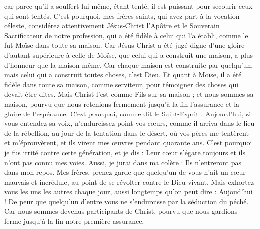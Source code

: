 \begin{multicols}{2}
car parce qu'il a souffert lui-même, étant tenté, il est puissant pour secourir ceux qui sont tentés.
\VerseOne{}C'est pourquoi, mes frères saints, qui avez part à la vocation céleste, considérez attentivement Jésus-Christ l'Apôtre et le Souverain Sacrificateur de notre profession,
qui a été fidèle à celui qui l'a établi, comme le fut Moïse dans toute sa maison.
Car Jésus-Christ a été jugé digne d'une gloire d'autant supérieure à celle de Moïse, que celui qui a construit une maison, a plus d’honneur que la maison même.
Car chaque maison est construite par quelqu'un, mais celui qui a construit toutes choses, c'est Dieu.
Et quant à Moïse, il a été fidèle dans toute sa maison, comme serviteur, pour témoigner des choses qui devait être dites.
Mais Christ l’est comme Fils sur sa maison ; et nous sommes sa maison, pourvu que nous retenions fermement jusqu’à la fin l'assurance et la gloire de l'espérance.
C'est pourquoi, comme dit le Saint-Esprit : Aujourd'hui, si vous entendez sa voix,
n'endurcissez point vos cœurs, comme il arriva dans le lieu de la rébellion, au jour de la tentation dans le désert,
où vos pères me tentèrent et m’éprouvèrent, et ils virent mes œuvres pendant quarante ans.
C'est pourquoi je fus irrité contre cette génération, et je dis : Leur cœur s'égare toujours et ils n'ont pas connu mes voies.
Aussi, je jurai dans ma colère : Ils n’entreront pas dans mon repos.
Mes frères, prenez garde que quelqu'un de vous n’ait un cœur mauvais et incrédule, au point de se révolter contre le Dieu vivant.
Mais exhortez-vous les uns les autres chaque jour, aussi longtemps qu'on peut dire : Aujoud'hui ! De peur que quelqu'un d'entre vous ne s'endurcisse par la séduction du péché.
Car nous sommes devenus participants de Christ, pourvu que nous gardions ferme jusqu'à la fin notre première assurance,

\end{multicols}
